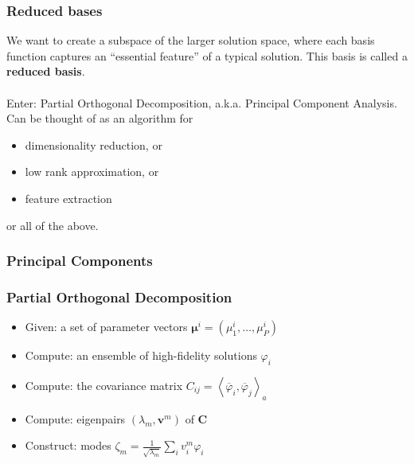 \documentclass{beamer}
\begin{document}
\begin{frame}[fragile]
  \frametitle{Reduced bases}

  We want to create a subspace of the larger solution space, where each basis
  function captures an ``essential feature'' of a typical solution. This basis
  is called a \textbf{reduced basis}. \\~\\

  Enter: Partial Orthogonal Decomposition, a.k.a. Principal Component Analysis.
  Can be thought of as an algorithm for
  \begin{itemize}
  \item dimensionality reduction, or
  \item low rank approximation, or
  \item feature extraction
  \end{itemize}
  or all of the above.
\end{frame}

\begin{frame}[fragile]
  \frametitle{Principal Components}

  \begin{center}
  \end{center}
\end{frame}

\begin{frame}[fragile]
  \frametitle{Partial Orthogonal Decomposition}

  \begin{itemize}
  \item Given: a set of parameter vectors $\bm\mu^i = (\mu^i_1, \ldots, \mu^i_P)$
  \item Compute: an ensemble of high-fidelity solutions $\varphi_i$
  \item Compute: the covariance matrix
    $C_{ij} = \left< \overline{\varphi}_i, \overline{\varphi}_j \right>_a$
  \item Compute: eigenpairs $(\lambda_m, \bm v^m)$ of $\bm C$
  \item Construct: modes $\zeta_m = \frac{1}{\sqrt{\lambda_m}} \sum_i v^m_i \varphi_i$
  \end{itemize}
\end{frame}
\end{document}
